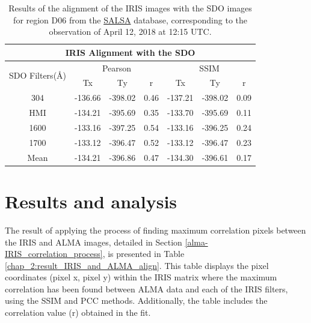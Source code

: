 \documentclass[a4paper,alpha-refs]{eSpectra}
\begin{document}
\begin{table}[h]
\centering
\caption{Results of the alignment of the IRIS images with the SDO images for region D06 from the \href{http://sdc.uio.no/salsa/}{SALSA} database, corresponding to the observation of April 12, 2018 at 12:15 UTC.}
\begin{tabular}{ccccccc}
\hline
\hline
\multicolumn{7}{c}{IRIS Alignment with the SDO}                                                                                                                  \\ \hline
\multicolumn{1}{c|}{\multirow{2}{*}{SDO Filters(Å)}} & \multicolumn{3}{c|}{Pearson}                                                  & \multicolumn{3}{c}{SSIM} \\ \cline{2-7} 
\multicolumn{1}{c|}{}                                & \multicolumn{1}{c}{Tx} & \multicolumn{1}{c}{Ty} & \multicolumn{1}{c|}{r}    & Tx      & Ty      & r    \\ \hline
\multicolumn{1}{c|}{304}                             & -136.66                 & -398.02                 & \multicolumn{1}{c|}{0.46} & -137.21 & -398.02 & 0.09 \\
\multicolumn{1}{c|}{HMI}                             & -134.21                 & -395.69                 & \multicolumn{1}{c|}{0.35} & -133.70 & -395.69 & 0.11 \\
\multicolumn{1}{c|}{1600}                            & -133.16                 & -397.25                 & \multicolumn{1}{c|}{0.54} & -133.16 & -396.25 & 0.24 \\
\multicolumn{1}{c|}{1700}                            & -133.12                 & -396.47                 & \multicolumn{1}{c|}{0.52} & -133.12 & -396.47 & 0.23 \\
\multicolumn{1}{c|}{Mean}                             & -134.21                 & -396.86                 & \multicolumn{1}{c|}{0.47} & -134.30 & -396.61 & 0.17 \\ \hline
\end{tabular}
\label{chap_2:result_IRIS_and_SDO_align}
\end{table}


\section{Results and analysis}


The result of applying the process of finding maximum correlation pixels between the IRIS and ALMA images,  detailed in Section \ref{alma-IRIS_correlation_process}, is presented in Table \ref{chap_2:result_IRIS_and_ALMA_align}.
This table displays the pixel coordinates (pixel x, pixel y) within the IRIS matrix where the maximum correlation has been found between ALMA data and each of the IRIS filters, using the SSIM and PCC methods. Additionally, the table includes the correlation value (r) obtained in the fit.
\end{document}

